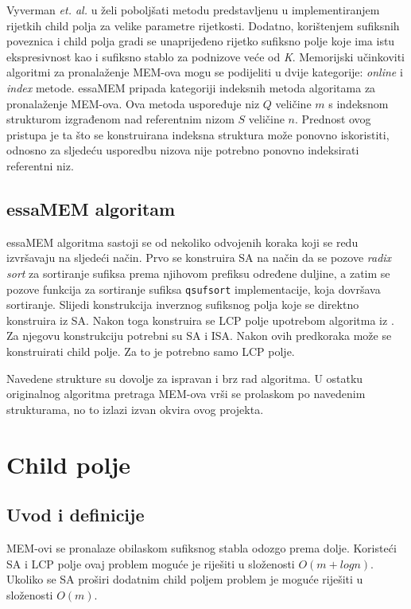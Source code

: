 \documentclass[times, utf8, seminar, numeric]{fer}
\begin{document}
Vyverman \textit{et. al.} u \cite{essa} želi poboljšati metodu predstavljenu u \cite{ssa} implementiranjem rijetkih child polja za velike parametre rijetkosti. Dodatno, korištenjem sufiksnih poveznica  i child polja gradi se unaprijeđeno rijetko sufiksno polje  koje ima istu ekspresivnost kao i sufiksno stablo za podnizove veće od \textit{K}. Memorijski učinkoviti algoritmi za pronalaženje MEM-ova mogu se podijeliti u dvije kategorije: \textit{online} i \textit{index} metode. essaMEM pripada kategoriji indeksnih metoda algoritama za pronalaženje MEM-ova. Ova metoda uspoređuje niz $Q$ veličine $m$ s indeksnom strukturom izgrađenom nad referentnim nizom $S$ veličine $n$. Prednost ovog pristupa je ta što se konstruirana indeksna struktura može ponovno iskoristiti, odnosno za sljedeću usporedbu nizova nije potrebno ponovno indeksirati referentni niz. 

\section{essaMEM algoritam}

essaMEM algoritma sastoji se od nekoliko odvojenih koraka koji se redu izvršavaju na sljedeći način. Prvo se konstruira SA na način da se pozove \textit{radix sort} za sortiranje sufiksa prema njihovom prefiksu određene duljine, a zatim se pozove funkcija za sortiranje sufiksa \texttt{qsufsort} implementacije, koja dovršava sortiranje. Slijedi konstrukcija inverznog sufiksnog polja  koje se direktno konstruira iz SA. Nakon toga konstruira se LCP polje upotrebom algoritma iz \cite{lcp}. Za njegovu konstrukciju potrebni su SA i ISA. Nakon ovih predkoraka može se konstruirati child polje. Za to je potrebno samo LCP polje.

Navedene strukture su dovolje za ispravan i brz rad algoritma. U ostatku originalnog algoritma pretraga MEM-ova vrši se prolaskom po navedenim strukturama, no to izlazi izvan okvira ovog projekta.

\chapter{Child polje}
\label{ch:child}

\section{Uvod i definicije}

MEM-ovi se pronalaze obilaskom sufiksnog stabla odozgo prema dolje. Koristeći SA i LCP polje ovaj problem moguće je riješiti u složenosti $O(m + log n)$. Ukoliko se SA proširi dodatnim child poljem problem je moguće riješiti u složenosti $O(m)$.
\end{document}

